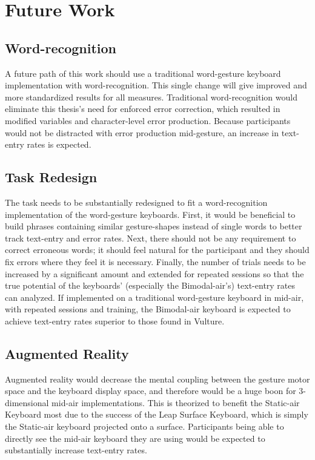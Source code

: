 \section{Future Work}
\subsection{Word-recognition}
A future path of this work should use a traditional word-gesture keyboard implementation with word-recognition. This single change will give improved and more standardized results for all measures. Traditional word-recognition would eliminate this thesis's need for enforced error correction, which resulted in modified variables and character-level error production. Because participants would not be distracted with error production mid-gesture, an increase in text-entry rates is expected.

\subsection{Task Redesign}
The task needs to be substantially redesigned to fit a word-recognition implementation of the word-gesture keyboards. First, it would be beneficial to build phrases containing similar gesture-shapes instead of single words to better track text-entry and error rates. Next, there should not be any requirement to correct erroneous words; it should feel natural for the participant and they should fix errors where they feel it is necessary. Finally, the number of trials needs to be increased by a significant amount and extended for repeated sessions so that the true potential of the keyboards' (especially the Bimodal-air's) text-entry rates can analyzed. If implemented on a traditional word-gesture keyboard in mid-air, with repeated sessions and training, the Bimodal-air keyboard is expected to achieve text-entry rates superior to those found in Vulture.

\subsection{Augmented Reality}
Augmented reality would decrease the mental coupling between the gesture motor space and the keyboard display space, and therefore would be a huge boon for 3-dimensional mid-air implementations. This is theorized to benefit the Static-air Keyboard most due to the success of the Leap Surface Keyboard, which is simply the Static-air keyboard projected onto a surface. Participants being able to directly see the mid-air keyboard they are using would be expected to substantially increase text-entry rates.

